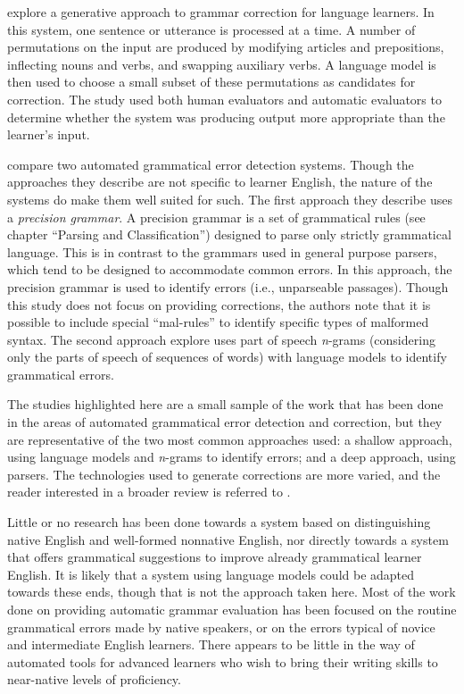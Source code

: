\documentclass[main.tex]{subfiles}
\begin{document}
\citet{lee:2006} explore a generative approach to grammar correction for language learners. In this system, one sentence or utterance is processed at a time. A number of permutations on the input are produced by modifying articles and prepositions, inflecting nouns and verbs, and swapping auxiliary verbs. A language model is then used to choose a small subset of these permutations as candidates for correction. The study used both human evaluators and automatic evaluators to determine whether the system was producing output more appropriate than the learner's input.

\citet{wagner:2007} compare two automated grammatical error detection systems. Though the approaches they describe are not specific to learner English, the nature of the systems do make them well suited for such. The first approach they describe uses a \textit{precision grammar}. A precision grammar is a set of grammatical rules (see chapter ``Parsing and Classification'') designed to parse only strictly grammatical language. This is in contrast to the grammars used in general purpose parsers, which tend to be designed to accommodate common errors. In this approach, the precision grammar is used to identify errors (i.e., unparseable passages). Though this study does not focus on providing corrections, the authors note that it is possible to include special ``mal-rules'' to identify specific types of malformed syntax. The second approach \citeauthor{wagner:2007} explore uses part of speech \textit{n}-grams (considering only the parts of speech of sequences of words) with language models to identify grammatical errors.

The studies highlighted here are a small sample of the work that has been done in the areas of automated grammatical error detection and correction, but they are representative of the two most common approaches used: a shallow approach, using language models and \textit{n}-grams to identify errors; and a deep approach, using parsers. The technologies used to generate corrections are more varied, and the reader interested in a broader review is referred to \citet{lee:2009}.

Little or no research has been done towards a system based on distinguishing native English and well-formed nonnative English, nor directly towards a system that offers grammatical suggestions to improve already grammatical learner English. It is likely that a system using language models could be adapted towards these ends, though that is not the approach taken here. Most of the work done on providing automatic grammar evaluation has been focused on the routine grammatical errors made by native speakers, or on the errors typical of novice and intermediate English learners. There appears to be little in the way of automated tools for advanced learners who wish to bring their writing skills to near-native levels of proficiency.


\biblio
\end{document}
